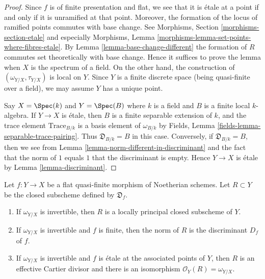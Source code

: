 \begin{proof}
Since $f$ is of finite presentation and flat, we see that it is \'etale
at a point if and only if it is unramified at that point. Moreover, the
formation of the locus of ramified points commutes with base change.
See Morphisms, Section \ref{morphisms-section-etale} and especially
Morphisms, Lemma \ref{morphisms-lemma-set-points-where-fibres-etale}.
By Lemma \ref{lemma-base-change-different} the formation of $R$ commutes
set theoretically with base change. Hence it suffices to prove the
lemma when $X$ is the spectrum of a field. On the other hand, the
construction of $(\omega_{Y/X}, \tau_{Y/X})$ is local on $Y$.
Since $Y$ is a finite discrete space (being quasi-finite
over a field), we may assume $Y$ has a unique point.

\medskip\noindent
Say $X = \Spec(k)$ and $Y = \Spec(B)$ where $k$ is a field and $B$ is
a finite local $k$-algebra. If $Y \to X$ is \'etale, then
$B$ is a finite separable extension of $k$, and the trace
element $\text{Trace}_{B/k}$ is a basis element of $\omega_{B/k}$
by Fields, Lemma \ref{fields-lemma-separable-trace-pairing}.
Thus $\mathfrak{D}_{B/k} = B$ in this case.
Conversely, if $\mathfrak{D}_{B/k} = B$, then we see from
Lemma \ref{lemma-norm-different-in-discriminant}
and the fact that the norm of $1$ equals $1$ that the
discriminant is empty. Hence
$Y \to X$ is \'etale by Lemma \ref{lemma-discriminant}.
\end{proof}

\begin{lemma}
\label{lemma-norm-different-is-discriminant}
Let $f : Y \to X$ be a flat quasi-finite morphism of Noetherian schemes.
Let $R \subset Y$ be the closed subscheme defined by $\mathfrak{D}_f$.
\begin{enumerate}
\item If $\omega_{Y/X}$ is invertible,
then $R$ is a locally principal closed subscheme of $Y$.
\item If $\omega_{Y/X}$ is invertible and $f$ is finite, then
the norm of $R$ is the discriminant $D_f$ of $f$.
\item If $\omega_{Y/X}$ is invertible and $f$
is \'etale at the associated points of $Y$, then $R$
is an effective Cartier divisor and there is an
isomorphism $\mathcal{O}_Y(R) = \omega_{Y/X}$.
\end{enumerate}
\end{lemma}

